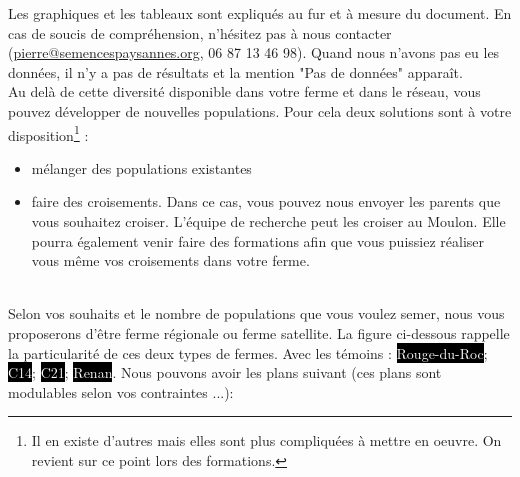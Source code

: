 Les graphiques et les tableaux sont expliqués au fur et à mesure du document.
En cas de soucis de compréhension, n'hésitez pas à nous contacter (\href{mailto:pierre@semencespaysannes.org}{pierre@semencespaysannes.org}, 06 87 13 46 98). 
Quand nous n'avons pas eu les données, il n'y a pas de résultats et la mention "Pas de données" apparaît.\\

Au delà de cette diversité disponible dans votre ferme et dans le réseau, vous pouvez développer de nouvelles populations.
Pour cela deux solutions sont à votre disposition\footnote{Il en existe d'autres mais elles sont plus compliquées à mettre en oeuvre. On revient sur ce point lors des formations.} : 

\begin{itemize}
\item mélanger des populations existantes
\item faire des croisements. Dans ce cas, vous pouvez nous envoyer les parents que vous souhaitez croiser. L'équipe de recherche peut les croiser au Moulon. Elle pourra également venir faire des formations afin que vous puissiez réaliser vous même vos croisements dans votre ferme.
\end{itemize}

~\\  

Selon vos souhaits et le nombre de populations que vous voulez semer, nous vous proposerons d'être ferme régionale ou ferme satellite.
La figure ci-dessous rappelle la particularité de ces deux types de fermes.
Avec les témoins : \colorbox{black}{\textcolor{white}{Rouge-du-Roc}}; \colorbox{black}{\textcolor{white}{C14}}; \colorbox{black}{\textcolor{white}{C21}}; \colorbox{black}{\textcolor{white}{Renan}}.
Nous pouvons avoir les plans suivant (ces plans sont modulables selon vos contraintes ...):

